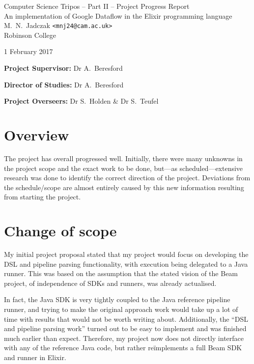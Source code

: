 \documentclass[11pt]{scrartcl}
\begin{document}
\begin{center}
\Large
Computer Science Tripos -- Part II -- Project Progress Report\\[4mm]
\LARGE
An implementation of Google Dataflow in the Elixir programming language\\[4mm]

\large
M.~N.~Jadczak \texttt{<mnj24@cam.ac.uk>}\\Robinson College

1 February 2017
\end{center}

\vspace{5mm}

\textbf{Project Supervisor:} Dr A.~Beresford

\textbf{Director of Studies:} Dr A.~Beresford

\textbf{Project Overseers:} Dr S.~Holden  \& Dr S.~Teufel


\section*{Overview}
The project has overall progressed well. Initially, there were many unknowns in the project scope and the exact work to be done, but---as scheduled---extensive research was done to identify the correct direction of the project. Deviations from the schedule/scope are almost entirely caused by this new information resulting from starting the project.

\section*{Change of scope}
My initial project proposal stated that my project would focus on developing the DSL and pipeline parsing functionality, with execution being delegated to a Java runner. This was based on the assumption that the stated vision of the Beam project, of independence of SDKs and runners, was already actualised.

In fact, the Java SDK is very tightly coupled to the Java reference pipeline runner, and trying to make the 
original approach work would take up a lot of time with results that would not be worth writing about. Additionally, the ``DSL and pipeline parsing work'' turned out to be easy to implement and was finished much earlier than expect. Therefore, my project now does not directly interface with any of the reference Java code, but rather re\"implements a full Beam SDK and runner in Elixir.
\end{document}
